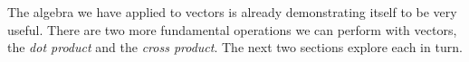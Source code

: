 The algebra we have applied to vectors is already demonstrating itself to be very useful. There are two more fundamental operations we can perform with vectors, the \emph{dot product} and the \emph{cross product}. The next two sections explore each in turn.

